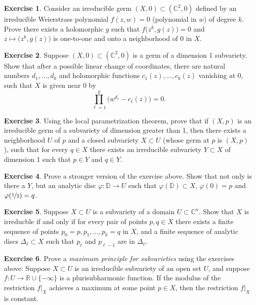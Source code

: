 \documentclass[12pt,openany]{book}
\newcommand{\C}{{\mathbb{C}}}
\newcommand{\R}{{\mathbb{R}}}
\newcommand{\D}{{\mathbb{D}}}
\theoremstyle{plain}
\theoremstyle{remark}
\theoremstyle{definition}
\newenvironment{exbox}{%
    \def\FrameCommand{\vrule width 1pt \relax\hspace{10pt}}%
    \MakeFramed{\advance\hsize-\width\FrameRestore}%
}{%
    \endMakeFramed
}
\theoremstyle{exercise}
\newtheorem{exercise}{Exercise}[section]
\theoremstyle{example}
\begin{document}
\begin{exbox}
\begin{exercise}
Consider an irreducible germ
$(X,0) \subset (\C^2,0)$ defined
by an irreducible Weierstrass polynomial $f(z,w) = 0$ (polynomial in $w$)
of degree $k$.  Prove there exists a holomorphic $g$ such that
$f\bigl(z^k,g(z)\bigr) = 0$ and $z \mapsto \bigl(z^k,g(z)\bigr)$
is one-to-one and onto a neighborhood of 0 in $X$.
\end{exercise}

\begin{exercise}
Suppose $(X,0) \subset (\C^2,0)$ is a germ of a dimension 1 subvariety.
Show that after a possible linear change of coordinates,
there are natural numbers
$d_1,\ldots,d_k$
and
holomorphic functions $c_1(z),\ldots,c_k(z)$ vanishing at $0$,
such that $X$ is given near $0$ by
\begin{equation*}
\prod_{\ell=1}^k {\bigl( w^{d_\ell} - c_\ell(z) \bigr)} = 0.
\end{equation*}
\end{exercise}

\begin{exercise}
Using the local parametrization theorem, prove that
if $(X,p)$ is an irreducible germ of a subvariety of dimension greater
than 1, then there exists a neighborhood $U$ of $p$ and a closed subvariety
$X \subset U$ (whose germ at $p$ is $(X,p)$), such that for every
$q \in X$ there exists an irreducible subvariety $Y \subset X$
of dimension 1 such that $p \in Y$ and $q \in Y$.
\end{exercise}

\begin{exercise}
\pagebreak[2]
Prove a stronger version of the exercise above.  Show that not only is there
a $Y$, but an analytic disc $\varphi \colon \D \to U$ such that
$\varphi(\D) \subset X$, $\varphi(0) = p$ and $\varphi(\nicefrac{1}{2}) =
q$.
\end{exercise}

\begin{exercise}
Suppose $X \subset U$ is a subvariety of a domain $U \subset \C^n$.
Show that $X$ is irreducble
if and only if
for every pair of points $p,q \in X$ there exists a finite sequence
of points $p_0 = p, p_1, \ldots, p_k = q$ in $X$, and a finite sequence of analytic discs
$\Delta_\ell \subset X$ such that $p_{\ell}$ and $p_{\ell-1}$ are in
$\Delta_\ell$.
\end{exercise}

\begin{exercise}\label{exercise:maxprincsubvar}
Prove a \emph{maximum principle for subvarieties} using the exercises above:
Suppose $X \subset U$ is an irreducible subvariety of an open set $U$,
and suppose $f \colon U \to \R \cup \{ - \infty \}$
is a plurisubharmonic function.  If the modulus of the restriction $f|_X$
achieves a maximum
at some point $p \in X$, then the restriction $f|_X$ is constant.
\end{exercise}


\end{exbox}
\end{document}
